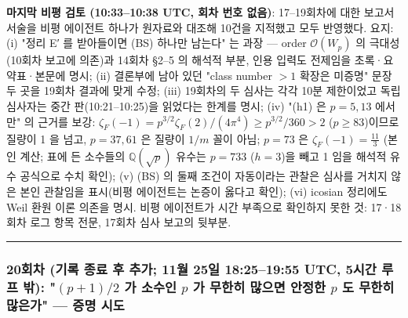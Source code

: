 \textbf{마지막 비평 검토 (10:33--10:38 UTC, 회차 번호 없음)}: 17--19회차에 대한 보고서 서술을 비평 에이전트 하나가 원자료와 대조해 10건을 지적했고 모두 반영했다. 요지: (i) "정리 E′ 를 받아들이면 (BS) 하나만 남는다" 는 과장 --- order \(\mathcal O(W_p)\) 의 극대성(10회차 보고에 의존)과 14회차 §2--5 의 해석적 부분, 인용 입력도 전제임을 초록·요약표·본문에 명시; (ii) 결론부에 남아 있던 "class number \(>1\) 확장은 미증명" 문장 두 곳을 19회차 결과에 맞게 수정; (iii) 19회차의 두 심사는 각각 10분 제한이었고 독립 심사자는 중간 판(10:21--10:25)을 읽었다는 한계를 명시; (iv) "(h1) 은 \(p=5,13\) 에서만" 의 근거를 보강: \(\zeta_F(-1)=p^{3/2}\zeta_F(2)/(4\pi^4)\ge p^{3/2}/360>2\) (\(p\ge83\))이므로 질량이 1 을 넘고, \(p=37,61\) 은 질량이 \(1/m\) 꼴이 아님; \(p=73\) 은 \(\zeta_F(-1)=\frac{11}3\) (본인 계산; 표에 든 소수들의 \(\mathbb Q(\sqrt p)\) 유수는 \(p=733\) (\(h=3\))을 빼고 1 임을 해석적 유수 공식으로 수치 확인); (v) (BS) 의 둘째 조건이 자동이라는 관찰은 심사를 거치지 않은 본인 관찰임을 표시(비평 에이전트는 논증이 옳다고 확인); (vi) icosian 정리에도 Weil 환원 이론 의존을 명시. 비평 에이전트가 시간 부족으로 확인하지 못한 것: 17·18회차 로그 항목 전문, 17회차 심사 보고의 뒷부분.

\begin{center}\rule{0.5\linewidth}{0.5pt}\end{center}

\hypertarget{uxd68cuxcc28-uxae30uxb85d-uxc885uxb8cc-uxd6c4-uxcd94uxac00-11uxc6d4-25uxc77c-18251955-utc-5uxc2dcuxac04-uxb8e8uxd504-uxbc16-p12-uxac00-uxc18cuxc218uxc778-p-uxac00-uxbb34uxd55cuxd788-uxb9ceuxc73cuxba74-uxc548uxc815uxd55c-p-uxb3c4-uxbb34uxd55cuxd788-uxb9ceuxc740uxac00-uxc99duxba85-uxc2dcuxb3c4}{%
\subsubsection*{\texorpdfstring{20회차 (기록 종료 후 추가; 11월 25일 18:25--19:55 UTC, 5시간 루프 밖): "\((p+1)/2\) 가 소수인 \(p\) 가 무한히 많으면 안정한 \(p\) 도 무한히 많은가" --- 증명 시도}{20회차 (기록 종료 후 추가; 11월 25일 18:25--19:55 UTC, 5시간 루프 밖): "(p+1)/2 가 소수인 p 가 무한히 많으면 안정한 p 도 무한히 많은가" --- 증명 시도}}\label{uxd68cuxcc28-uxae30uxb85d-uxc885uxb8cc-uxd6c4-uxcd94uxac00-11uxc6d4-25uxc77c-18251955-utc-5uxc2dcuxac04-uxb8e8uxd504-uxbc16-p12-uxac00-uxc18cuxc218uxc778-p-uxac00-uxbb34uxd55cuxd788-uxb9ceuxc73cuxba74-uxc548uxc815uxd55c-p-uxb3c4-uxbb34uxd55cuxd788-uxb9ceuxc740uxac00-uxc99duxba85-uxc2dcuxb3c4}}

